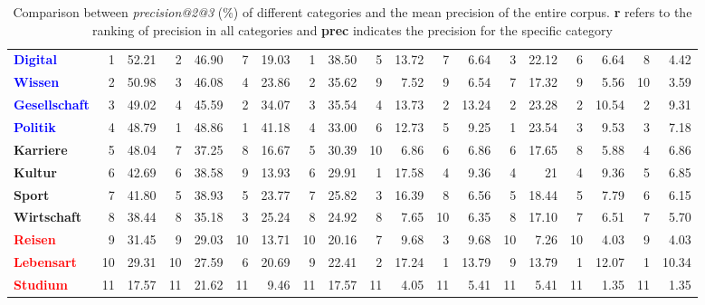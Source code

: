 \begin{table}[!htb]
{\begin{tabular}{lrr|rr|rr|rr|rr|rr|rr|rr|rr}
\textbf{\textcolor{blue}{Digital}} & 1 & 52.21 & 2  & 46.90 & 7  & 19.03 & 1  & 38.50 & 5  & 13.72 & 7  & 6.64 & 3  & 22.12 & 6  & 6.64 & 8  & 4.42 \\
\textbf{\textcolor{blue}{Wissen}} & 2 & 50.98 & 3  & 46.08 & 4  & 23.86 & 2  & 35.62 & 9  & 7.52 & 9  & 6.54 & 7  & 17.32 & 9  & 5.56 & 10  & 3.59 \\
\textbf{\textcolor{blue}{Gesellschaft}} & 3  & 49.02 & 4  & 45.59 & 2  & 34.07 & 3  & 35.54 & 4  & 13.73 & 2  & 13.24 & 2  & 23.28 & 2  & 10.54 & 2  & 9.31 \\
\textbf{\textcolor{blue}{Politik}} & 4  & 48.79 & 1  & 48.86 & 1  & 41.18 & 4  & 33.00  & 6  & 12.73 & 5  & 9.25 & 1  & 23.54 & 3  & 9.53 & 3  & 7.18 \\
\textbf{Karriere} & 5  & 48.04 & 7  & 37.25 & 8  & 16.67 & 5  & 30.39 & 10  & 6.86 & 6  & 6.86 & 6  & 17.65 & 8  & 5.88 & 4  & 6.86 \\
\textbf{Kultur} & 6  & 42.69 & 6  & 38.58 & 9  & 13.93 & 6  & 29.91 & 1  & 17.58 & 4  & 9.36 & 4  & 21  & 4  & 9.36 & 5  & 6.85 \\
\textbf{Sport} & 7  & 41.80 & 5  & 38.93 & 5  & 23.77 & 7  & 25.82 & 3  & 16.39 & 8  & 6.56 & 5  & 18.44 & 5  & 7.79 & 6  & 6.15 \\
\textbf{Wirtschaft} & 8  & 38.44 & 8  & 35.18 & 3  & 25.24 & 8  & 24.92 & 8  & 7.65 & 10  & 6.35 & 8  & 17.10 & 7  & 6.51 & 7  & 5.70 \\
\textbf{\textcolor{red}{Reisen}} & 9  & 31.45 & 9  & 29.03 & 10  & 13.71 & 10  & 20.16 & 7  & 9.68 & 3  & 9.68 & 10  & 7.26 & 10  & 4.03 & 9  & 4.03 \\
\textbf{\textcolor{red}{Lebensart}} & 10  & 29.31 & 10  & 27.59 & 6  & 20.69 & 9  & 22.41 & 2  & 17.24 & 1  & 13.79 & 9  & 13.79 & 1  & 12.07 & 1  & 10.34 \\
\textbf{\textcolor{red}{Studium}} & 11  & 17.57 & 11  & 21.62 & 11  & 9.46 & 11  & 17.57 & 11  & 4.05 & 11  & 5.41 & 11  & 5.41 & 11  & 1.35 & 11  & 1.35 \\ \hline

\end{tabular}%
}
\caption[Comparison between \textit{precision@2@3} (\%) of different categories and the mean precision of the entire corpus]{Comparison between \textit{precision@2@3} (\%) of different categories and the mean precision of the entire corpus. \textbf{r} refers to the ranking of precision in all categories and \textbf{prec} indicates the precision for the specific category}
\label{tab:cate_precision}
\end{table}



